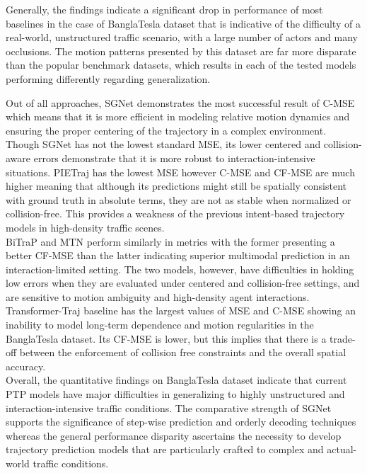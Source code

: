 \documentclass[12pt, a4paper]{article}
\begin{document}
Generally, the findings indicate a significant drop in performance of most baselines in the case of BanglaTesla dataset that is indicative of the difficulty of a real-world, unstructured traffic scenario, with a large number of actors and many occlusions. The motion patterns presented by this dataset are far more disparate than the popular benchmark datasets, which results in each of the tested models performing differently regarding generalization. 

Out of all approaches, SGNet \cite{wang2022stepwise} demonstrates the most successful result of C-MSE which means that it is more efficient in modeling relative motion dynamics and ensuring the proper centering of the trajectory in a complex environment. Though SGNet has not the lowest standard MSE, its lower centered and collision-aware errors demonstrate that it is more robust to interaction-intensive situations. PIETraj \cite{rasouli2019pie} has the lowest MSE however C-MSE and CF-MSE are much higher meaning that although its predictions might still be spatially consistent with ground truth in absolute terms, they are not as stable when normalized or collision-free. This provides a weakness of the previous intent-based trajectory models in high-density traffic scenes.\\

BiTraP \cite{yao2021bitrap} and MTN \cite{yin2021multimodal} perform similarly in metrics with the former presenting a better CF-MSE than the latter indicating superior multimodal prediction in an interaction-limited setting. The two models, however, have difficulties in holding low errors when they are evaluated under centered and collision-free settings, and are sensitive to motion ambiguity and high-density agent interactions. Transformer-Traj \cite{giuliari2021transformer} baseline has the largest values of MSE and C-MSE showing an inability to model long-term dependence and motion regularities in the BanglaTesla dataset. Its CF-MSE is lower, but this implies that there is a trade-off between the enforcement of collision free constraints and the overall spatial accuracy.\\

Overall, the quantitative findings on BanglaTesla dataset indicate that current PTP models have major difficulties in generalizing to highly unstructured and interaction-intensive traffic conditions. The comparative strength of SGNet supports the significance of step-wise prediction and orderly decoding techniques whereas the general performance disparity ascertains the necessity to develop trajectory prediction models that are particularly crafted to complex and actual-world traffic conditions.
\end{document}
